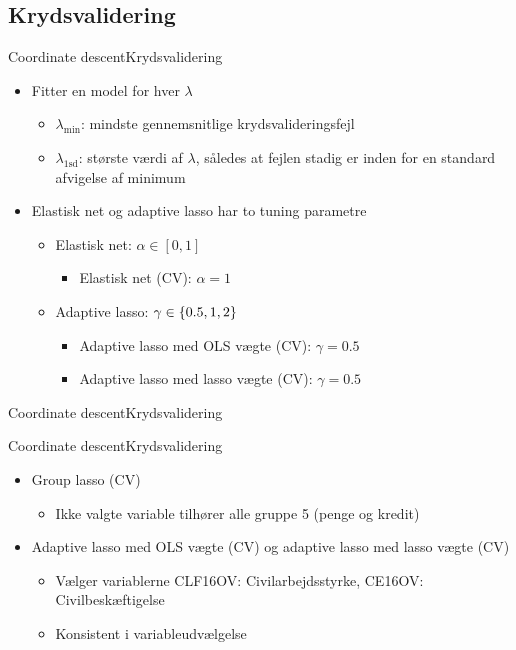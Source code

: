 \subsection{Krydsvalidering}
\begin{frame}{Coordinate descent}{Krydsvalidering}
\begin{itemize}
\item Fitter en model for hver $\lambda$
\begin{itemize}
\item $\lambda_{\min}$: mindste gennemsnitlige krydsvalideringsfejl
\item $\lambda_{1\text{sd}}$: største værdi af $\lambda$, således at fejlen stadig er inden for en standard afvigelse af minimum 
\end{itemize}
\item Elastisk net og adaptive lasso har to tuning parametre
\begin{itemize}
\item Elastisk net: $\alpha \in [0,1]$ 
\begin{itemize}
\item Elastisk net (CV): $\alpha = 1$
\end{itemize}
\item Adaptive lasso: $\gamma \in \cbr{0.5, 1, 2}$
\begin{itemize}
\item Adaptive lasso med OLS vægte (CV): $\gamma = 0.5$
\item Adaptive lasso med lasso vægte (CV): $\gamma = 0.5$
\end{itemize}
\end{itemize}
\end{itemize}
\end{frame}

\begin{frame}{Coordinate descent}{Krydsvalidering}

\end{frame}


\begin{frame}{Coordinate descent}{Krydsvalidering}
\begin{itemize}
\item Group lasso (CV)
\begin{itemize}
\item Ikke valgte variable tilhører alle gruppe 5 (penge og kredit)
\end{itemize}
\item Adaptive lasso med OLS vægte (CV) og adaptive lasso med lasso vægte (CV)
\begin{itemize}
\item Vælger variablerne \textcolor{blue3}{CLF16OV}: Civilarbejdsstyrke,   \textcolor{blue3}{CE16OV}: Civilbeskæftigelse   
\item Konsistent i variableudvælgelse
\end{itemize}
\end{itemize}
\end{frame}


